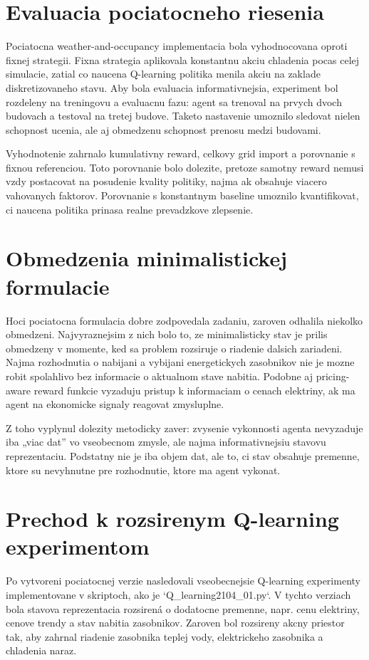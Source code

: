 \documentclass[conference]{IEEEtran}
\begin{document}
\section{Evaluacia pociatocneho riesenia}
Pociatocna weather-and-occupancy implementacia bola vyhodnocovana oproti fixnej strategii. Fixna strategia aplikovala konstantnu akciu chladenia pocas celej simulacie, zatial co naucena Q-learning politika menila akciu na zaklade diskretizovaneho stavu. Aby bola evaluacia informativnejsia, experiment bol rozdeleny na treningovu a evaluacnu fazu: agent sa trenoval na prvych dvoch budovach a testoval na tretej budove. Taketo nastavenie umoznilo sledovat nielen schopnost ucenia, ale aj obmedzenu schopnost prenosu medzi budovami.

Vyhodnotenie zahrnalo kumulativny reward, celkovy grid import a porovnanie s fixnou referenciou. Toto porovnanie bolo dolezite, pretoze samotny reward nemusi vzdy postacovat na posudenie kvality politiky, najma ak obsahuje viacero vahovanych faktorov. Porovnanie s konstantnym baseline umoznilo kvantifikovat, ci naucena politika prinasa realne prevadzkove zlepsenie.

\section{Obmedzenia minimalistickej formulacie}
Hoci pociatocna formulacia dobre zodpovedala zadaniu, zaroven odhalila niekolko obmedzeni. Najvyraznejsim z nich bolo to, ze minimalisticky stav je prilis obmedzeny v momente, ked sa problem rozsiruje o riadenie dalsich zariadeni. Najma rozhodnutia o nabijani a vybijani energetickych zasobnikov nie je mozne robit spolahlivo bez informacie o aktualnom stave nabitia. Podobne aj pricing-aware reward funkcie vyzaduju pristup k informaciam o cenach elektriny, ak ma agent na ekonomicke signaly reagovat zmysluplne.

Z toho vyplynul dolezity metodicky zaver: zvysenie vykonnosti agenta nevyzaduje iba „viac dat” vo vseobecnom zmysle, ale najma informativnejsiu stavovu reprezentaciu. Podstatny nie je iba objem dat, ale to, ci stav obsahuje premenne, ktore su nevyhnutne pre rozhodnutie, ktore ma agent vykonat.

\section{Prechod k rozsirenym Q-learning experimentom}
Po vytvoreni pociatocnej verzie nasledovali vseobecnejsie Q-learning experimenty implementovane v skriptoch, ako je `Q_learning2104_01.py`. V tychto verziach bola stavova reprezentacia rozsirená o dodatocne premenne, napr. cenu elektriny, cenove trendy a stav nabitia zasobnikov. Zaroven bol rozsireny akcny priestor tak, aby zahrnal riadenie zasobnika teplej vody, elektrickeho zasobnika a chladenia naraz.
\end{document}
